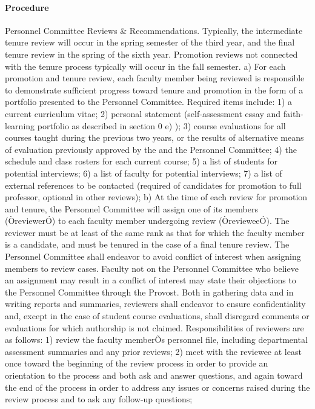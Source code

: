 \documentclass[letterpaper, 11pt]{article}
\begin{document}
			\paragraph{Procedure}
				Personnel Committee Reviews \& Recommendations.  Typically, the intermediate tenure review will occur in the spring semester of the third year, and the final tenure review in the spring of the sixth year.  Promotion reviews not connected with the tenure process typically will occur in the fall semester.
				a) For each promotion and tenure review, each faculty member being reviewed is responsible to demonstrate sufficient progress toward tenure and promotion in the form of a portfolio presented to the Personnel Committee. Required items include:
				1) a current curriculum vitae;
				2) personal statement (self-assessment essay and faith-learning portfolio as described in section 0 e) );
				3) course evaluations for all courses taught during the previous two years, or the results of alternative means of evaluation previously approved by the and the Personnel Committee;
				4) the schedule and class rosters for each current course;
				5) a list of students for potential interviews;
				6) a list of faculty for potential interviews;
				7) a list of external references to be contacted (required of candidates for promotion to full professor, optional in other reviews);
				b) At the time of each review for promotion and tenure, the Personnel Committee will assign one of its members (ÒreviewerÓ) to each faculty member undergoing review (ÒrevieweeÓ).  The reviewer must be at least of the same rank as that for which the faculty member is a candidate, and must be tenured in the case of a final tenure review.  The Personnel Committee shall endeavor to avoid conflict of interest when assigning members to review cases.  Faculty not on the Personnel Committee who believe an assignment may result in a conflict of interest may state their objections to the Personnel Committee through the Provost.  Both in gathering data and in writing reports and summaries, reviewers shall endeavor to ensure confidentiality and, except in the case of student course evaluations, shall disregard comments or evaluations for which authorship is not claimed.  Responsibilities of reviewers are as follows:
				1) review the faculty memberÕs personnel file, including departmental assessment summaries and any prior reviews;
				2) meet with the reviewee at least once toward the beginning of the review process in order to provide an orientation to the process and both ask and answer questions, and again toward the end of the process in order to address any issues or concerns raised during the review process and to ask any follow-up questions;
\end{document}
